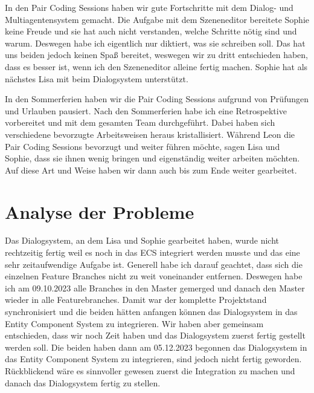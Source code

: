 In den Pair Coding Sessions haben wir gute Fortschritte mit dem Dialog- und Multiagentensystem gemacht. Die Aufgabe mit dem Szeneneditor bereitete Sophie keine Freude und sie hat auch nicht verstanden, welche Schritte nötig sind und warum. Deswegen habe ich eigentlich nur diktiert, was sie schreiben soll. Das hat uns beiden jedoch keinen Spaß bereitet, weswegen wir zu dritt entschieden haben, dass es besser ist, wenn ich den Szeneneditor alleine fertig machen. Sophie hat als nächstes Lisa mit beim Dialogsystem unterstützt.

In den Sommerferien haben wir die Pair Coding Sessions aufgrund von Prüfungen und Urlauben pausiert. Nach den Sommerferien habe ich eine Retrospektive vorbereitet und mit dem gesamten Team durchgeführt. Dabei haben sich verschiedene bevorzugte Arbeitsweisen heraus kristallisiert. Während Leon die Pair Coding Sessions bevorzugt und weiter führen möchte, sagen Lisa und Sophie, dass sie ihnen wenig bringen und eigenständig weiter arbeiten möchten. Auf diese Art und Weise haben wir dann auch bis zum Ende weiter gearbeitet.

\section{Analyse der Probleme}

Das Dialogsystem, an dem Lisa und Sophie gearbeitet haben, wurde nicht rechtzeitig fertig weil es noch in das ECS integriert werden musste und das eine sehr zeitaufwendige Aufgabe ist. Generell habe ich darauf geachtet, dass sich die einzelnen Feature Branches nicht zu weit voneinander entfernen. Deswegen habe ich am 09.10.2023 alle Branches in den Master gemerged und danach den Master wieder in alle Featurebranches. Damit war der komplette Projektstand synchronisiert und die beiden hätten anfangen können das Dialogsystem in das Entity Component System zu integrieren. Wir haben aber gemeinsam entschieden, dass wir noch Zeit haben und das Dialogsystem zuerst fertig gestellt werden soll. Die beiden haben dann am 05.12.2023 begonnen das Dialogsystem in das Entity Component System zu integrieren, sind jedoch nicht fertig geworden. Rückblickend wäre es sinnvoller gewesen zuerst die Integration zu machen und danach das Dialogsystem fertig zu stellen.


